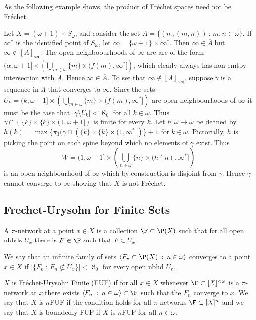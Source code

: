 \documentclass{article}
\newcommand{\seqcl}[1]{{[#1]_{\text{seq}}}}
\begin{document}
As the following example shows, the product of Fréchet spaces need not be Fréchet.
\begin{exam}
    Let \(X = (\omega + 1) \times S_\omega\), and consider the set \(A = \{(m, (m, n))\: : \:  m, n \in \omega\}\). If \(\infty^{\ast}\) is the identified point of \(S_{\omega}\), let \(\infty = \{\omega + 1\} \times \infty^{\ast}\). Then \(\infty \in \overline{A}\) but \(\infty \not \in \seqcl{A}\). The open neighboourhoods of \(\infty\) are are of the form \((\alpha, \omega + 1] \times\left(\bigcup_{m \in \omega}\{m\} \times (f(m), \infty^{\ast}]\right)\), which clearly always has non emtpy intersection with \(A\). Hence \(\infty \in \overline{A}\). To see that \(\infty \not \in \seqcl{A}\), suppose \(\gamma\) is a sequence in \(A\) that converges to \(\infty\). Since the sets \(U_k = (k, \omega + 1] \times\left(\bigcup_{m \in \omega}\{m\} \times (f(m), \infty^{\ast}]\right)\) are open neighbourhoods of \(\infty\) it must be the case that \(|\gamma \setminus U_k | < \aleph_0\) for all \(k \in \omega\). Thus  \(\gamma\cap\left(\{k\}\times\{k\}\times(1,\omega + 1]\right)\) is finite for every \(k\). Let \(h:\omega \to \omega\) be defined by \(h(k) = \max\{\pi_3(\gamma\cap\left(\{k\}\times\{k\}\times(1,\infty^{\ast}]\right)\} + 1\) for \(k \in \omega\). Pictorially, \(h\) is picking the point on each spine beyond which no elements of \(\gamma\) exist. Thus 
    \[
    W = (1, \omega + 1] \times\left(\bigcup_{n \in \omega}\{n\}\times(h(n), \infty^{\ast}]\right)
    \] 
    is an open neighbourhood of \(\infty\) which by construction is disjoint from \(\gamma\). Hence \(\gamma\) cannot converge to \(\infty\) showing that \(X\) is not Fréchet.
\end{exam}

\subsection{Frechet-Urysohn for Finite Sets}

\begin{defn}
    A \(\pi\)-network at a point \(x \in X\) is a collection \(\F \subset \P(X)\) such that for all open nbhds \(U_x\) there is \(F \in \F\) such that \(F \subset U_x\).
\end{defn}
\begin{defn}
    We say that an infinite family of sets  \(\langle F_n \subset \P(X) \: : \: n \in \omega\rangle\) converges to a point \(x \in X\) if \(|\{F_n \: : \: F_n \not \subset U_x\}| < \aleph_0\) for every open nbhd \(U_x\). 
\end{defn}
\begin{defn}
    \(X\) is Fréchet-Urysohn Finite (FUF) if for all \(x \in X\) whenever \(\F \subset [X]^{<\omega}\) is a \(\pi\)-network at \(x\) there exists \(\langle F_n \: : \: n \in \omega\rangle \subset \F\) such that the \(F_n\) converge to \(x\). We say that \(X\) is \(n\)FUF if the condition holds for all \(\pi\)-networks \(\F \subset [X]^n\) and we say that \(X\) is boundedly FUF if \(X\) is \(n\)FUF for all \(n \in \omega\).
\end{defn}
\end{document}
